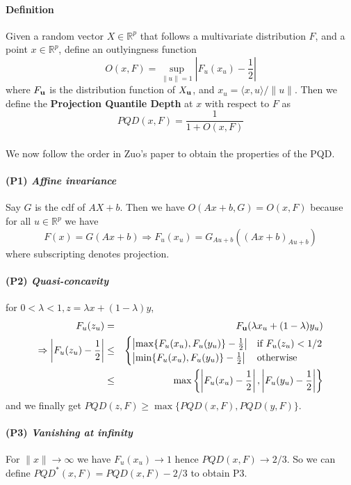 \documentclass{article}
\begin{document}
\paragraph{Definition}
Given a random vector $X\in \mathbb{R}^p$ that follows a multivariate distribution $F$, and a point $x\in\mathbb{R}^p$, define an outlyingness function
$$ O(x,F) = \sup_{\|u\|=1} \left\vert F_u(x_u)-\frac{1}{2}\right\vert $$
where $F_{\bf{u}}$ is the distribution function of $X_{\bf{u}}$, and $x_u=\langle x,u\rangle/\|u\| $. Then we define the \textbf{Projection Quantile Depth} at $x$ with respect to $F$ as
$$ PQD(x,F) = \frac{1}{1+O(x,F)} $$

\paragraph{}We now follow the order in Zuo's paper to obtain the properties of the PQD.

\paragraph{(P1) \textit{Affine invariance}} Say $G$ is the cdf of $AX+b$. Then we have $O(Ax+b,G)=O(x,F)$ because for all $u\in\mathbb{R}^p$ we have
$$ F(x)= G(Ax+b) \Rightarrow F_u(x_u) = G_{Au+b}\left((Ax+b)_{Au+b}\right)$$
where subscripting denotes projection.

\paragraph{(P2) \textit{Quasi-concavity}} for $0<\lambda<1, z=\lambda x+(1-\lambda)y$,
\begin{eqnarray*}
F_u(z_u) &=& F_{\bf{u}} (\lambda x_u+(1-\lambda)y_u)\\
\Rightarrow \left\vert F_u(z_u)-\frac{1}{2}\right\vert &\leq &
\begin{cases}
\left\vert \max\{F_u(x_u),F_u(y_u)\}-\frac{1}{2}\right\vert & \mbox{if } F_u(z_u)<1/2\\
\left\vert \min\{F_u(x_u),F_u(y_u)\}-\frac{1}{2}\right\vert & \mbox{otherwise}
\end{cases}\\
&\leq & \max\left\lbrace \left\vert F_u(x_u)-\frac{1}{2}\right\vert, \left\vert F_u(y_u)-\frac{1}{2}\right\vert \right\rbrace
\end{eqnarray*}
and we finally get $PQD(z,F)\geq\max\{PQD(x,F),PQD(y,F)\}$.

\paragraph{(P3) \textit{Vanishing at infinity}}For $\|x\|\rightarrow\infty$ we have $F_u(x_u)\rightarrow 1$ hence $PQD(x,F)\rightarrow 2/3$. So we can define $PQD^*(x,F)=PQD(x,F)-2/3$ to obtain P3.
\end{document}
